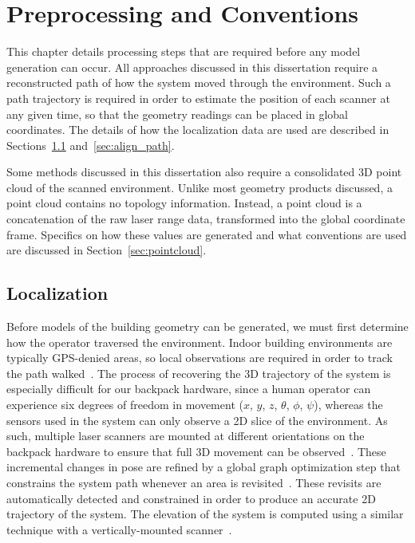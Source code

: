 \documentclass[12pt,onecolumn,oneside]{book}
\begin{document}
\chapter{Preprocessing and Conventions}
\label{ch:preprocessing}

This chapter details processing steps that are required before any model generation can occur.  All approaches discussed in this dissertation require a reconstructed path of how the system moved through the environment.  Such a path trajectory is required in order to estimate the position of each scanner at any given time, so that the geometry readings can be placed in global coordinates.  The details of how the localization data are used are described in Sections~\ref{sec:localization} and~\ref{sec:align_path}.

Some methods discussed in this dissertation also require a consolidated 3D point cloud of the scanned environment.  Unlike most geometry products discussed, a point cloud contains no topology information.  Instead, a point cloud is a concatenation of the raw laser range data, transformed into the global coordinate frame.  Specifics on how these values are generated and what conventions are used are discussed in Section~\ref{sec:pointcloud}.

\section{Localization}
\label{sec:localization}

Before models of the building geometry can be generated, we must first determine how the operator traversed the environment.  Indoor building environments are typically GPS-denied areas, so local observations are required in order to track the path walked~\cite{Backpack,Localization,NickJournal}.  The process of recovering the 3D trajectory of the system is especially difficult for our backpack hardware, since a human operator can experience six degrees of freedom in movement ($x$, $y$, $z$, $\theta$, $\phi$, $\psi$), whereas the sensors used in the system can only observe a 2D slice of the environment.  As such, multiple laser scanners are mounted at different orientations on the backpack hardware to ensure that full 3D movement can be observed~\cite{NickJournal}.  These incremental changes in pose are refined by a global graph optimization step that constrains the system path whenever an area is revisited~\cite{toro07}.  These revisits are automatically detected and constrained in order to produce an accurate 2D trajectory of the system.  The elevation of the system is computed using a similar technique with a vertically-mounted scanner~\cite{Backpack}.
\end{document}
